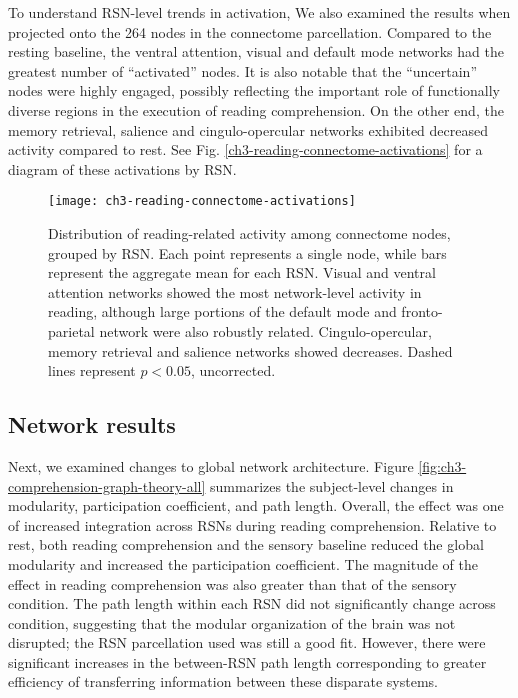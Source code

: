 To understand RSN-level trends in activation, We also examined the results when projected onto the 264 nodes in the connectome parcellation. Compared to the resting baseline, the ventral attention, visual and default mode networks had the greatest number of ``activated'' nodes. It is also notable that the ``uncertain'' nodes were highly engaged, possibly reflecting the important role of functionally diverse regions in the execution of reading comprehension. On the other end, the memory retrieval, salience and cingulo-opercular networks exhibited decreased activity compared to rest. See Fig. \ref{ch3-reading-connectome-activations} for a diagram of these activations by RSN. 

\begin{figure}[t]
	\centering
	\texttt{[image: ch3-reading-connectome-activations]}
    \caption[Distribution of reading-related activity among RSN nodes.]{Distribution of reading-related activity among connectome nodes, grouped by RSN. Each point represents a single node, while bars represent the aggregate mean for each RSN. Visual and ventral attention networks showed the most network-level activity in reading, although large portions of the default mode and fronto-parietal network were also robustly related. Cingulo-opercular, memory retrieval and salience networks showed decreases. Dashed lines represent $p < 0.05$, uncorrected.}
	\label{fig:ch3-reading-connectome-activations}
\end{figure}


\subsection{Network results}

Next, we examined changes to global network architecture. Figure \ref{fig:ch3-comprehension-graph-theory-all} summarizes the subject-level changes in modularity, participation coefficient, and path length. Overall, the effect was one of increased integration across RSNs during reading comprehension. Relative to rest, both reading comprehension and the sensory baseline reduced the global modularity and increased the participation coefficient. The magnitude of the effect in reading comprehension was also greater than that of the sensory condition. The path length within each RSN did not significantly change across condition, suggesting that the modular organization of the brain was not disrupted; the RSN parcellation used was still a good fit. However, there were significant increases in the between-RSN path length corresponding to greater efficiency of transferring information between these disparate systems.

